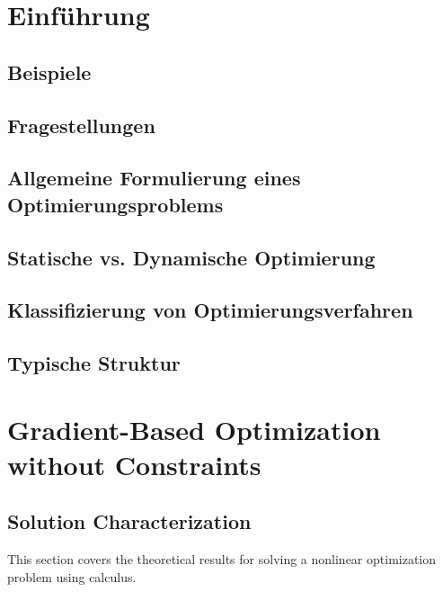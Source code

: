 
\chapter{Einführung} %

	\section{Beispiele} %

	\section{Fragestellungen} %

	\section{Allgemeine Formulierung eines Optimierungsproblems} %

	\section{Statische vs. Dynamische Optimierung} %

	\section{Klassifizierung von Optimierungsverfahren} %

	\section{Typische Struktur} %

\chapter{Gradient-Based Optimization without Constraints}
	\label{c:gradientOptimization}

	\section{Solution Characterization}
		This section covers the theoretical results for solving a nonlinear optimization problem using calculus.

